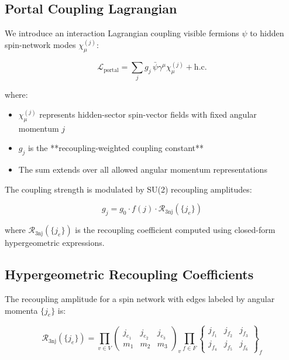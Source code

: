 \documentclass[12pt]{article}
\begin{document}
\subsection{Portal Coupling Lagrangian}

We introduce an interaction Lagrangian coupling visible fermions $\psi$ to hidden spin-network modes $\chi^{(j)}_\mu$:

\begin{equation}
\mathcal{L}_{\text{portal}} = \sum_{j} g_j \, \bar{\psi} \gamma^\mu \chi^{(j)}_\mu + \text{h.c.}
\end{equation}

where:
\begin{itemize}
\item $\chi^{(j)}_\mu$ represents hidden-sector spin-vector fields with fixed angular momentum $j$
\item $g_j$ is the **recoupling-weighted coupling constant**
\item The sum extends over all allowed angular momentum representations
\end{itemize}

The coupling strength is modulated by SU(2) recoupling amplitudes:

\begin{equation}
g_j = g_0 \cdot f(j) \cdot \mathcal{R}_{\text{3nj}}(\{j_e\})
\end{equation}

where $\mathcal{R}_{\text{3nj}}(\{j_e\})$ is the recoupling coefficient computed using closed-form hypergeometric expressions.

\subsection{Hypergeometric Recoupling Coefficients}

The recoupling amplitude for a spin network with edges labeled by angular momenta $\{j_e\}$ is:

\begin{equation}
\mathcal{R}_{\text{3nj}}(\{j_e\}) = \prod_{v \in V} \begin{pmatrix} j_{e_1} & j_{e_2} & j_{e_3} \\ m_1 & m_2 & m_3 \end{pmatrix}_v \prod_{f \in F} \begin{Bmatrix} j_{f_1} & j_{f_2} & j_{f_3} \\ j_{f_4} & j_{f_5} & j_{f_6} \end{Bmatrix}_f
\end{equation}
\end{document}
